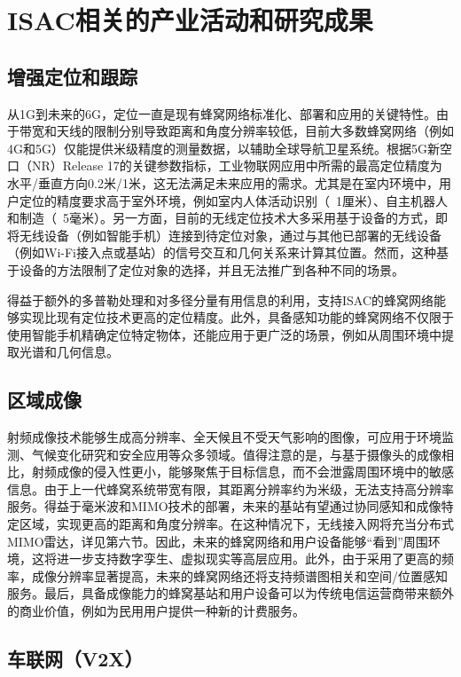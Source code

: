 \section{ISAC相关的产业活动和研究成果}

\subsection{增强定位和跟踪}

从1G到未来的6G，定位一直是现有蜂窝网络标准化、部署和应用的关键特性。由于带宽​​和天线的限制分别导致距离和角度分辨率较低，目前大多数蜂窝网络（例如4G和5G）仅能提供米级精度的测量数据，以辅助全球导航卫星系统。根据5G新空口（NR）Release 17的关键参数指标，工业物联网应用中所需的最高定位精度为水平/垂直方向0.2米/1米，这无法满足未来应用的需求。尤其是在室内环境中，用户定位的精度要求高于室外环境，例如室内人体活动识别（~1厘米）、自主机器人和制造（~5毫米）。另一方面，目前的无线定位技术大多采用基于设备的方式，即将无线设备（例如智能手机）连接到待定位对象，通过与其他已部署的无线设备（例如Wi-Fi接入点或基站）的信号交互和几何关系来计算其位置。然而，这种基于设备的方法限制了定位对象的选择，并且无法推广到各种不同的场景。

得益于额外的多普勒处理和对多径分量有用信息的利用，支持ISAC的蜂窝网络能够实现比现有定位技术更高的定位精度。此外，具备感知功能的蜂窝网络不仅限于使用智能手机精确定位特定物体，还能应用于更广泛的场景，例如从周围环境中提取光谱和几何信息。

\subsection{区域成像}

射频成像技术能够生成高分辨率、全天候且不受天气影响的图像，可应用于环境监测、气候变化研究和安全应用等众多领域。值得注意的是，与基于摄像头的成像相比，射频成像的侵入性更小，能够聚焦于目标信息，而不会泄露周围环境中的敏感信息。由于上一代蜂窝系统带宽有限，其距离分辨率约为米级，无法支持高分辨率服务。得益于毫米波和MIMO技术的部署，未来的基站有望通过协同感知和成像特定区域，实现更高的距离和角度分辨率。在这种情况下，无线接入网将充当分布式MIMO雷达，详见第六节。因此，未来的蜂窝网络和用户设备能够“看到”周围环境，这将进一步支持数字孪生、虚拟现实等高层应用。此外，由于采用了更高的频率，成像分辨率显著提高，未来的蜂窝网络还将支持频谱图相关和空间/位置感知服务。最后，具备成像能力的蜂窝基站和用户设备可以为传统电信运营商带来额外的商业价值，例如为民用用户提供一种新的计费服务。

\subsection{车联网（V2X）}

